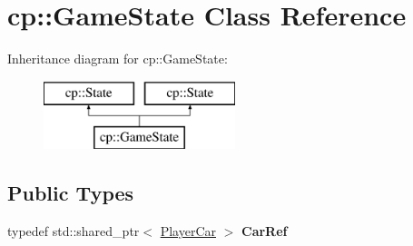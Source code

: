 \hypertarget{classcp_1_1_game_state}{}\section{cp\+:\+:Game\+State Class Reference}
\label{classcp_1_1_game_state}
Inheritance diagram for cp\+:\+:Game\+State\+:\begin{figure}[H]
\begin{center}
\leavevmode
\includegraphics[height=2.000000cm]{classcp_1_1_game_state}
\end{center}
\end{figure}
\subsection*{Public Types}
\begin{DoxyCompactItemize}
\item 
\mbox{\label{classcp_1_1_game_state_ae6b57da0779db6b2c6458aa484496d61}} 
typedef std\+::shared\+\_\+ptr$<$ \hyperlink{classcp_1_1_player_car}{Player\+Car} $>$ {\bfseries Car\+Ref}
\end{DoxyCompactItemize}
